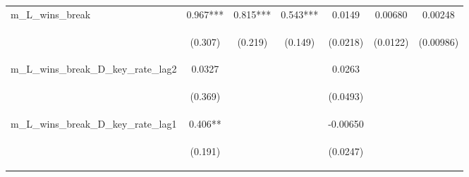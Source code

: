 \documentclass[]{article}
\begin{document}
\begin{center}
\begin{tabular}{lcccccc}
m\_L\_wins\_break & 0.967*** & 0.815*** & 0.543*** & 0.0149 & 0.00680 & 0.00248 \\
\vspace{4pt} & \begin{footnotesize}(0.307)\end{footnotesize} & \begin{footnotesize}(0.219)\end{footnotesize} & \begin{footnotesize}(0.149)\end{footnotesize} & \begin{footnotesize}(0.0218)\end{footnotesize} & \begin{footnotesize}(0.0122)\end{footnotesize} & \begin{footnotesize}(0.00986)\end{footnotesize} \\
m\_L\_wins\_break\_D\_key\_rate\_lag2 & 0.0327 &  &  & 0.0263 &  &  \\
\vspace{4pt} & \begin{footnotesize}(0.369)\end{footnotesize} & \begin{footnotesize}\end{footnotesize} & \begin{footnotesize}\end{footnotesize} & \begin{footnotesize}(0.0493)\end{footnotesize} & \begin{footnotesize}\end{footnotesize} & \begin{footnotesize}\end{footnotesize} \\
m\_L\_wins\_break\_D\_key\_rate\_lag1 & 0.406** &  &  & -0.00650 &  &  \\
\vspace{4pt} & \begin{footnotesize}(0.191)\end{footnotesize} & \begin{footnotesize}\end{footnotesize} & \begin{footnotesize}\end{footnotesize} & \begin{footnotesize}(0.0247)\end{footnotesize} & \begin{footnotesize}\end{footnotesize} & \begin{footnotesize}\end{footnotesize} \\

\end{tabular}
\end{center}
\end{document}
